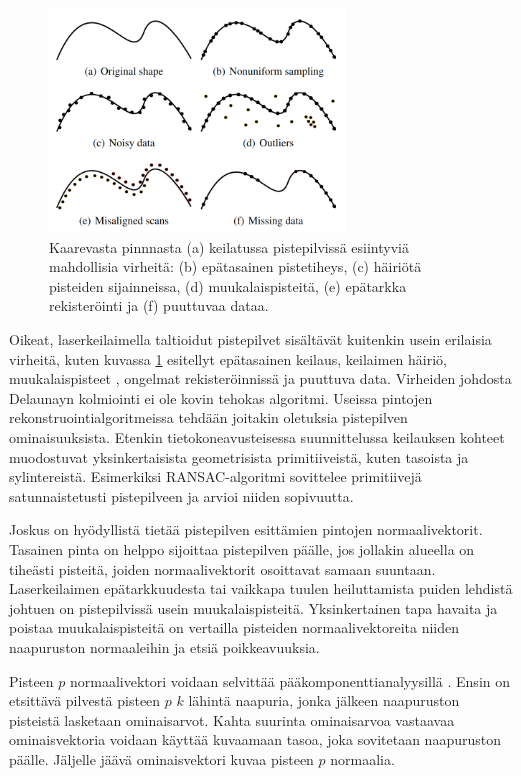 \begin{figure}
    \centering
    \includegraphics[width=0.7\textwidth]{img/artifacts.png}
    \caption{Kaarevasta pinnnasta (a) keilatussa pistepilvissä esiintyviä mahdollisia virheitä: (b) epätasainen pistetiheys, (c) häiriötä pisteiden sijainneissa, (d) muukalaispisteitä, (e) epätarkka rekisteröinti ja (f) puuttuvaa dataa. \cite{berger}}
    \label{img:artifacts}
\end{figure}

Oikeat, laserkeilaimella taltioidut pistepilvet sisältävät kuitenkin usein erilaisia virheitä, kuten kuvassa \ref{img:artifacts} esitellyt epätasainen keilaus, keilaimen häiriö, muukalaispisteet , ongelmat rekisteröinnissä ja puuttuva data. Virheiden johdosta Delaunayn kolmiointi ei ole kovin tehokas algoritmi. Useissa pintojen rekonstruointialgoritmeissa tehdään joitakin oletuksia pistepilven ominaisuuksista. Etenkin tietokoneavusteisessa suunnittelussa keilauksen kohteet muodostuvat yksinkertaisista geometrisista primitiiveistä, kuten tasoista ja sylintereistä. Esimerkiksi RANSAC-algoritmi \cite{ransac} sovittelee primitiivejä satunnaistetusti pistepilveen ja arvioi niiden sopivuutta. \cite{berger} 

Joskus on hyödyllistä tietää pistepilven esittämien pintojen normaalivektorit. Tasainen pinta on helppo sijoittaa pistepilven päälle, jos jollakin alueella on tiheästi pisteitä, joiden normaalivektorit osoittavat samaan suuntaan. Laserkeilaimen epätarkkuudesta tai vaikkapa tuulen heiluttamista puiden lehdistä johtuen on pistepilvissä usein muukalaispisteitä. Yksinkertainen tapa havaita ja poistaa muukalaispisteitä on vertailla pisteiden normaalivektoreita niiden naapuruston normaaleihin ja etsiä poikkeavuuksia. 

Pisteen $p$ normaalivektori voidaan selvittää pääkomponenttianalyysillä . Ensin on etsittävä pilvestä pisteen $p$ $k$ lähintä naapuria, jonka jälkeen naapuruston pisteistä lasketaan ominaisarvot. Kahta suurinta ominaisarvoa vastaavaa ominaisvektoria voidaan käyttää kuvaamaan tasoa, joka sovitetaan naapuruston päälle. Jäljelle jäävä ominaisvektori kuvaa pisteen $p$ normaalia. \cite{huang}

